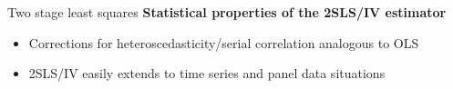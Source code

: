 \documentclass[usenames,dvipsnames]{beamer}
\begin{document}
\begin{frame}{Two stage least squares}
\textbf{Statistical properties of the 2SLS/IV estimator}
\vspace{0.5cm}
\begin{itemize}
\item Corrections for heteroscedasticity/serial correlation analogous to OLS
\vspace{0.3cm}
\item 2SLS/IV easily extends to time series and panel data situations
\end{itemize}
\end{frame}
\end{document}
